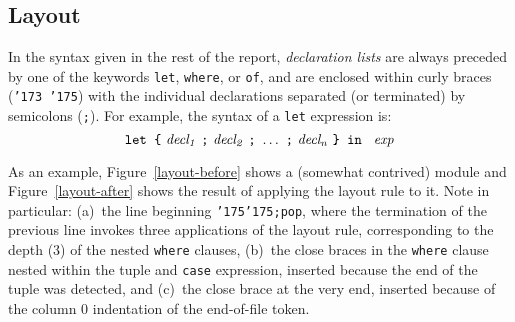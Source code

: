 \subsection{Layout}
\label{lexemes-layout}

In the syntax given in the rest of the report, {\em declaration
lists} are always preceded by one of the keywords \mbox{\tt let}, \mbox{\tt where},
or \mbox{\tt of}, and are enclosed within curly braces (\mbox{\tt {\char'173}\ {\char'175}}) with
the individual declarations separated (or terminated) by semicolons
(\mbox{\tt ;}). For example, the syntax of a \mbox{\tt let} expression is:
\[
\mbox{$\it \makebox{\tt let\ {\char'173}}\ decl_1\ \makebox{\tt ;}\ decl_2\ \makebox{\tt ;}\ \ldots \ \makebox{\tt ;}\ decl_n\ \makebox{\tt {\char'175}\ in\ }\ exp$}
\]



As an example, Figure~\ref{layout-before} shows a (somewhat contrived)
module and Figure~\ref{layout-after} shows the result of applying the
layout rule to it.  Note in particular: (a)~the line beginning \mbox{\tt {\char'175}{\char'175};pop},
where the termination of the previous line invokes three applications
of the layout rule, corresponding to the depth (3) of the nested
\mbox{\tt where} clauses, (b)~the close braces in the \mbox{\tt where} clause nested
within the tuple and \mbox{\tt case} expression, inserted because the end of the
tuple was detected, and (c)~the close brace at the very end, inserted
because of the column 0 indentation of the end-of-file token.

